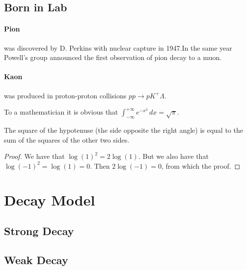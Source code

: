 \documentclass[
10pt, %
a4paper, %
oneside, %
headinclude,footinclude, %
BCOR5mm, %
]{scrartcl}
\begin{document}



\subsection{Born in Lab}

\paragraph{Pion}was discovered by D. Perkins with nuclear capture in 1947\cite{bibitem1}.In the same year Powell's group announced the first observation of pion decay to a muon\cite{bibitem2}.
\paragraph{Kaon}was produced in proton-proton collisions $pp\rightarrow pK^+\Lambda$\cite{bibitem3}.
 



\begin{definition}[Gauss] 
To a mathematician it is obvious that
$\int_{-\infty}^{+\infty}
e^{-x^2}\,dx=\sqrt{\pi}$. 
\end{definition} 

\begin{theorem}[Pythagoras]
The square of the hypotenuse (the side opposite the right angle) is equal to the sum of the squares of the other two sides.
\end{theorem}

\begin{proof} 
We have that $\log(1)^2 = 2\log(1)$.
But we also have that $\log(-1)^2=\log(1)=0$.
Then $2\log(-1)=0$, from which the proof.
\end{proof}


\section{Decay Model}

\subsection{Strong Decay}

\subsection{Weak Decay}
\end{document}
